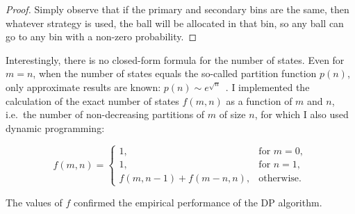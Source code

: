 \begin{proof}
    Simply observe that if the primary and secondary bins are the same, then whatever strategy is used, the ball will be allocated in that bin, so any ball can go to any bin with a non-zero probability.
\end{proof}




Interestingly, there is no closed-form formula for the number of states.  Even for $m=n$, when the number of states equals the so-called partition function $p(n)$, only approximate results are known: $p(n) \sim e^{\sqrt{n}}$~\cite{hardy1918partitionfunction}. I implemented the calculation of the exact number of states $f(m, n)$ as a function of $m$ and $n$, i.e.\ the number of non-decreasing partitions of $m$ of size $n$, for which I also used dynamic programming:

\begin{equation} \label{eq: numberofpartitions}
    f(m, n) = \begin{cases}
        1, & \text{for } m=0,\\
        1, & \text{for } n=1,\\
        f(m,n-1)+f(m-n,n), & \text{otherwise}.
    \end{cases}
\end{equation}


The values of $f$ confirmed the empirical performance of the DP algorithm.

